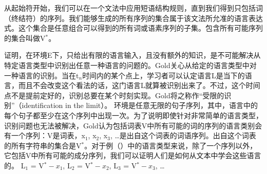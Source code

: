 从起始符开始，我们可以在一个文法中应用短语结构规则，直到我们得到只包括词（终结符）的序列。我们能够生成的所有序列的集合属于该文法所允准的语言表达式。这个集合是任意组合可以得到的所有词或语素序列的子集。包含所有可能序列的集合叫做V$^*$。
  
\cite{Gold67a}证明，在环境E下，只给出有限的语言输入，且没有额外的知识，是不可能解决从特定语言类型中识别出任意一种语言的问题的。Gold关心从给定的语言类型中对一种语言的识别。当在t$_n$时间内的某个点上，学习者可以认定语言L是当下的语言，而且不会改变这个看法的话，这门语言L就算被识别出来了。不过，这个时间点不是提前定好的，识别总要在某个时刻实现。Gold将之称作“受限的识别”（identification in the limit）。
环境是任意无限的句子序列，其中，语言中的每个句子都至少在这个序列中出现一次。为了说明即使针对非常简单的语言类型，识别问题也无法被解决，Gold认为包括词表V中所有可能的词的序列的语言类别会有一个序列：V是词表，x$_1$, x$_2$, x$_3$, \ldots{}是出自这个词表的词语序列。出自这个词表的所有字符串的集合是V$^*$。对于例（）中的语言类型来说，除了一个序列以外，它包括V中所有可能的成分序列，我们可以证明人们是如何从文本中学会这些语言的。
\ea
L$_1$ = V$^* - x_1$, L$_2$ = V$^* - x_2$, L$_3$ = V$^* - x_3$, \ldots
\z

